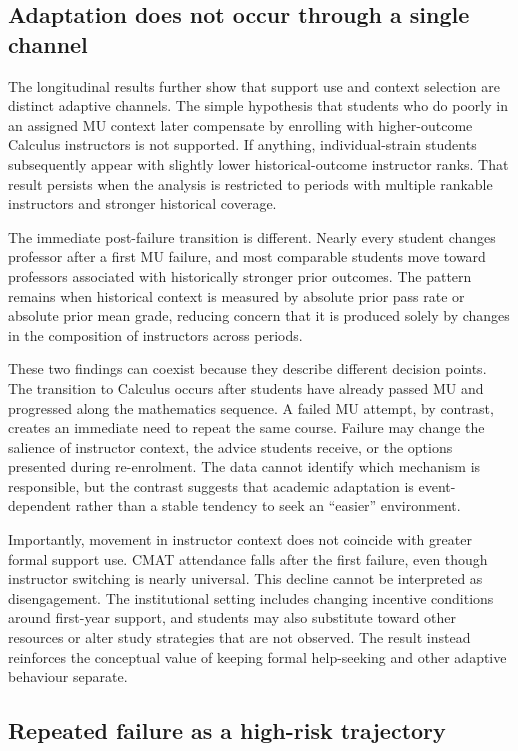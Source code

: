 \subsection{Adaptation does not occur through a single channel}

The longitudinal results further show that support use and context selection are distinct adaptive channels. The simple hypothesis that students who do poorly in an assigned MU context later compensate by enrolling with higher-outcome Calculus instructors is not supported. If anything, individual-strain students subsequently appear with slightly lower historical-outcome instructor ranks. That result persists when the analysis is restricted to periods with multiple rankable instructors and stronger historical coverage.

The immediate post-failure transition is different. Nearly every student changes professor after a first MU failure, and most comparable students move toward professors associated with historically stronger prior outcomes. The pattern remains when historical context is measured by absolute prior pass rate or absolute prior mean grade, reducing concern that it is produced solely by changes in the composition of instructors across periods.

These two findings can coexist because they describe different decision points. The transition to Calculus occurs after students have already passed MU and progressed along the mathematics sequence. A failed MU attempt, by contrast, creates an immediate need to repeat the same course. Failure may change the salience of instructor context, the advice students receive, or the options presented during re-enrolment. The data cannot identify which mechanism is responsible, but the contrast suggests that academic adaptation is event-dependent rather than a stable tendency to seek an ``easier'' environment.

Importantly, movement in instructor context does not coincide with greater formal support use. CMAT attendance falls after the first failure, even though instructor switching is nearly universal. This decline cannot be interpreted as disengagement. The institutional setting includes changing incentive conditions around first-year support, and students may also substitute toward other resources or alter study strategies that are not observed. The result instead reinforces the conceptual value of keeping formal help-seeking and other adaptive behaviour separate.

\subsection{Repeated failure as a high-risk trajectory}

